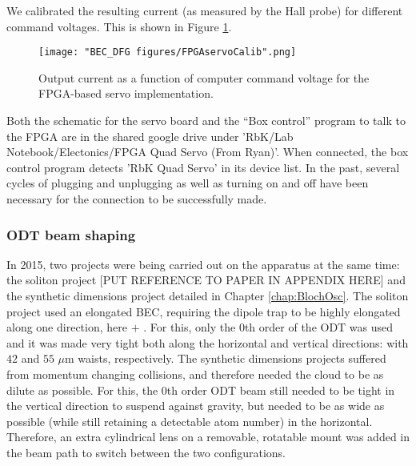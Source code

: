 We calibrated the resulting current (as measured by the Hall probe) for different command voltages. This is shown in Figure \ref{fig:FPGAservoCalib}. 
\begin{figure}
	\texttt{[image: "BEC\_DFG figures/FPGAservoCalib".png]}
\caption[Output current as a function of computer command voltage]{Output current as a function of computer command voltage for the FPGA-based servo implementation. }
\label{fig:FPGAservoCalib}
\end{figure}
Both the schematic for the servo board and the “Box control” program to talk to the FPGA are in the shared google drive under 'RbK/Lab Notebook/Electonics/FPGA Quad Servo (From Ryan)'. When connected, the box control program detects 'RbK Quad Servo' in its device list. In the past, several cycles of plugging and unplugging as well as turning on and off have been necessary for the connection to be successfully made.
\subsubsection{ODT beam shaping}\label{sec:ODTbeamShape}

In 2015, two projects were being carried out on the apparatus at the same time: the soliton project [PUT REFERENCE TO PAPER IN APPENDIX HERE]\cite{Aycock2017} and the synthetic dimensions project detailed in Chapter \ref{chap:BlochOsc}. The soliton project used an elongated BEC, requiring the dipole trap to be highly elongated along one direction, here \ex{} $+$ \ey{}. For this, only the 0th order of the ODT was used and it was made very tight both along the horizontal and vertical directions: with $42$ and $55$ $\mu$m waists, respectively. The synthetic dimensions projects suffered from momentum changing collisions, and therefore needed the cloud to be as dilute as possible. For this, the 0th order ODT beam still needed to be tight in the vertical direction to suspend against gravity, but needed to be as wide as possible (while still retaining a detectable atom number) in the horizontal. Therefore, an extra cylindrical lens on a removable, rotatable mount was added in the beam path to switch between the two configurations. 


